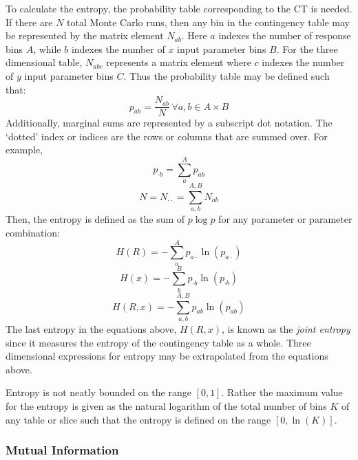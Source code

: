To calculate the entropy, the probability table corresponding to the CT is needed.  If there are $N$ 
total Monte Carlo runs, then any bin in
the contingency table may be represented by the matrix element $N_{ab}$.  Here $a$ indexes the number 
of response bins $A$, while $b$
indexes the number of $x$ input parameter bins $B$.  For the three dimensional table, $N_{abc}$ 
represents a matrix element where $c$ indexes the number of $y$
input parameter bins $C$.  Thus the probability table may be defined such that:
\begin{equation} p_{ab} = \frac{N_{ab}}{N} \, \forall a, b\in A\times B\end{equation}
Additionally, marginal sums are represented by a subscript dot notation.  The `dotted' index or 
indices are the rows or columns that are summed over.  For example,
\begin{equation} p_{\cdot b} = \sum_a^A p_{ab} \end{equation}
\begin{equation} N = N_{\cdot \cdot} = \sum_{a,b}^{A,B} N_{ab} \end{equation}
Then, the entropy is defined as the sum of $p\log p$ for any parameter or parameter combination:
\begin{equation} H(R) = - \sum_a^A p_{a \cdot} \ln(p_{a \cdot}) \end{equation}
\begin{equation} H(x) = - \sum_b^B p_{\cdot b} \ln(p_{\cdot b}) \end{equation}
\begin{equation} H(R,x) = - \sum_{a,b}^{A,B} p_{ab} \ln(p_{ab}) \end{equation}
The last entropy in the equations above, $H(R,x)$, is known as the \emph{joint entropy} since 
it measures the entropy of the contingency table as a whole.
Three dimensional expressions for entropy may be extrapolated from the equations above.

Entropy is not neatly bounded on the range $[0,1]$.
Rather the maximum value for the entropy is given as the natural logarithm of the total 
number of bins $K$ of any table or slice such that
the entropy is defined on the range $[0, \ln(K)]$.

\subsubsection{Mutual Information}
\label{sec:mutual_information}

